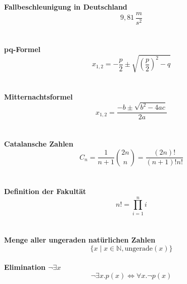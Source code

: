 \begin{center}

\textbf{Fallbeschleunigung in Deutschland}
$$9,81\,\frac{m}{s^2}$$ \\
~ \\

\textbf {pq-Formel}
$$x_{1,2} = - \frac{p}{2} \pm \sqrt{\left(\frac{p}{2}\right)^2 - q}$$ \\
~ \\

\textbf{Mitternachtsformel} 
$$x_{1,2} = \frac{-b \pm \sqrt{b^2 - 4ac}}{2a}$$ \\
~ \\

\textbf{Catalansche Zahlen}
\begin{equation*} C_n = \frac{1}{n+1} {2n \choose n} = \frac{(2n)!}{(n+1)!n!} \end{equation*} \\
~ \\

\textbf{Definition der Fakultät} 
$$n! = \prod_{i=1}^{n} i$$ \\
~ \\

\textbf{Menge aller ungeraden natürlichen Zahlen}
$$\{ x \mid x \in \mathds{N}, \mathrm{ungerade}(x) \}$$
~ \\

\textbf{Elimination $\neg\exists x$}
$$\neg\exists x . p(x) \Leftrightarrow \forall x . \neg p(x)$$
\end{center}